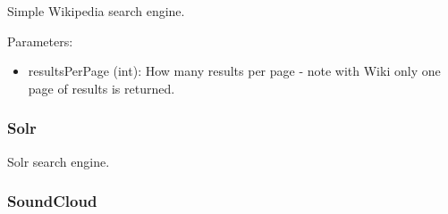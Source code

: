 \documentclass[letterpaper,10pt,english]{sphinxmanual}
\begin{document}
\begin{fulllineitems}
\label{api2.0:puppy.search.engine.SimpleWikipedia}
Simple Wikipedia search engine.

Parameters:
\begin{itemize}
\item {} 
resultsPerPage (int): How many results per page - note with Wiki only one page of results is returned.

\end{itemize}

\end{fulllineitems}



\subsubsection{Solr}
\label{api2.0:solr}

\begin{fulllineitems}
\label{api2.0:puppy.search.engine.Solr}
Solr search engine.

\end{fulllineitems}



\subsubsection{SoundCloud}
\label{api2.0:soundcloud}
\end{document}
